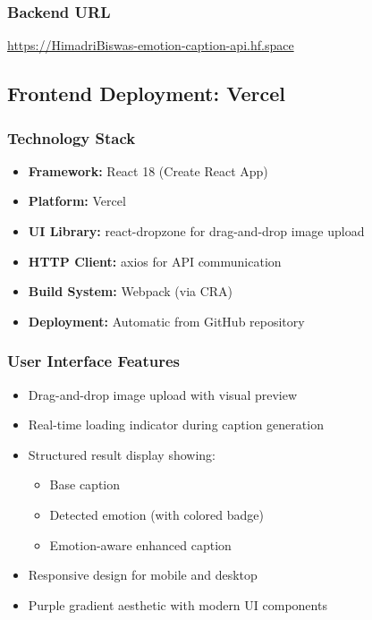 \documentclass[12pt]{article}
\begin{document}
\subsubsection{Backend URL}
\begin{center}
\Large
\url{https://HimadriBiswas-emotion-caption-api.hf.space}
\end{center}

\subsection{Frontend Deployment: Vercel}

\subsubsection{Technology Stack}
\begin{itemize}
\item \textbf{Framework:} React 18 (Create React App)
\item \textbf{Platform:} Vercel
\item \textbf{UI Library:} react-dropzone for drag-and-drop image upload
\item \textbf{HTTP Client:} axios for API communication
\item \textbf{Build System:} Webpack (via CRA)
\item \textbf{Deployment:} Automatic from GitHub repository
\end{itemize}

\subsubsection{User Interface Features}
\begin{itemize}
\item Drag-and-drop image upload with visual preview
\item Real-time loading indicator during caption generation
\item Structured result display showing:
  \begin{itemize}
  \item Base caption
  \item Detected emotion (with colored badge)
  \item Emotion-aware enhanced caption
  \end{itemize}
\item Responsive design for mobile and desktop
\item Purple gradient aesthetic with modern UI components
\end{itemize}
\end{document}
